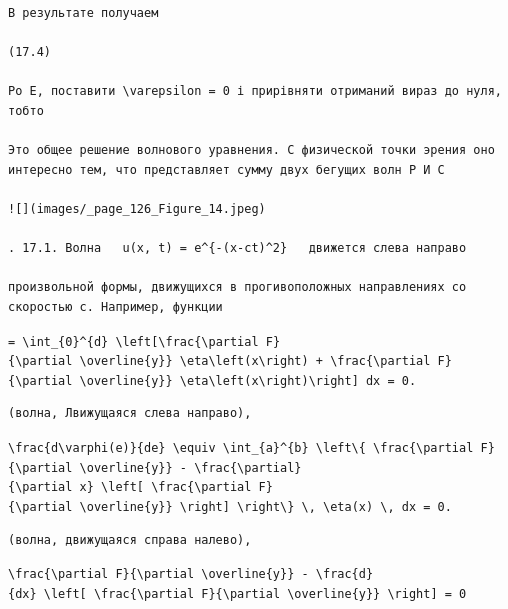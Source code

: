\documentclass[
  ukrainian,
]{article}
\begin{document}
\begin{verbatim}
В результате получаем

(17.4)

Po E, поставити \varepsilon = 0 і прирівняти отриманий вираз до нуля, тобто

Это общее решение волнового уравнения. С физической точки эрения оно интересно тем, что представляет сумму двух бегущих волн Р И С

![](images/_page_126_Figure_14.jpeg)

. 17.1. Волна   u(x, t) = e^{-(x-ct)^2}   движется слева направо

произвольной формы, движущихся в прогивоположных направлениях со скоростью c. Например, функции
\end{verbatim}

\texttt{=\ \textbackslash{}int\_\{0\}\^{}\{d\}\ \textbackslash{}left{[}\textbackslash{}frac\{\textbackslash{}partial\ F\}\{\textbackslash{}partial\ \textbackslash{}overline\{y\}\}\ \textbackslash{}eta\textbackslash{}left(x\textbackslash{}right)\ +\ \textbackslash{}frac\{\textbackslash{}partial\ F\}\{\textbackslash{}partial\ \textbackslash{}overline\{y\textquotesingle{}\}\}\ \textbackslash{}eta\textquotesingle{}\textbackslash{}left(x\textbackslash{}right)\textbackslash{}right{]}\ dx\ =\ 0.}

\begin{verbatim}
(волна, Лвижущаяся слева направо),
\end{verbatim}

\texttt{\textbackslash{}frac\{d\textbackslash{}varphi(e)\}\{de\}\ \textbackslash{}equiv\ \textbackslash{}int\_\{a\}\^{}\{b\}\ \textbackslash{}left\textbackslash{}\{\ \textbackslash{}frac\{\textbackslash{}partial\ F\}\{\textbackslash{}partial\ \textbackslash{}overline\{y\}\}\ -\ \textbackslash{}frac\{\textbackslash{}partial\}\{\textbackslash{}partial\ x\}\ \textbackslash{}left{[}\ \textbackslash{}frac\{\textbackslash{}partial\ F\}\{\textbackslash{}partial\ \textbackslash{}overline\{y\textquotesingle{}\}\}\ \textbackslash{}right{]}\ \textbackslash{}right\textbackslash{}\}\ \textbackslash{},\ \textbackslash{}eta(x)\ \textbackslash{},\ dx\ =\ 0.}

\begin{verbatim}
(волна, движущаяся справа налево),
\end{verbatim}

\texttt{\textbackslash{}frac\{\textbackslash{}partial\ F\}\{\textbackslash{}partial\ \textbackslash{}overline\{y\}\}\ -\ \textbackslash{}frac\{d\}\{dx\}\ \textbackslash{}left{[}\ \textbackslash{}frac\{\textbackslash{}partial\ F\}\{\textbackslash{}partial\ \textbackslash{}overline\{y\textquotesingle{}\}\}\ \textbackslash{}right{]}\ =\ 0}
\end{document}
